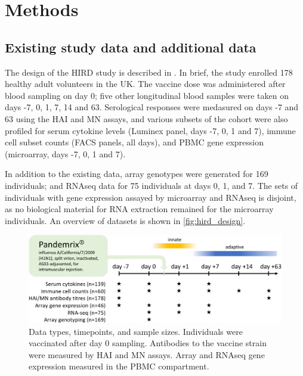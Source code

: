\section{Methods}

\subsection{Existing  study data and additional data}

The design of the \gls{HIRD} study is described in \autocite{sobolev2016AdjuvantedInfluenzaH1N1Vaccination}.
In brief, the study enrolled 178 healthy adult volunteers in the UK.
The vaccine dose was administered after blood sampling on day 0; five other longitudinal blood samples were taken on days -7, 0, 1, 7, 14 and 63.
Serological responses were medasured on days -7 and 63 using the \gls{HAI} and \gls{MN} assays, and various subsets of the cohort were also profiled for serum cytokine levels (Luminex panel, days -7, 0, 1 and 7), immune cell subset counts (\gls{FACS} panels, all days), and \gls{PBMC} gene expression (microarray, days -7, 0, 1 and 7).

In addition to the existing data, array genotypes were generated for 169 individuals; and \gls{RNAseq} data for 75 individuals at days 0, 1, and 7.
The sets of individuals with gene expression assayed by microarray and \gls{RNAseq} is disjoint, as no biological material for RNA extraction remained for the microarray individuals.
An overview of datasets is shown in \autoref{fig:hird_design}.

\begin{figure}
    \includegraphics[width=1.0\textwidth]{mainmatter/figures/chapter_02/graphics_ashg19/hird_design-crop.pdf}
    \caption{Data types, timepoints, and sample sizes. Individuals were vaccinated after day 0 sampling. Antibodies to the vaccine strain were measured by \gls{HAI} and \gls{MN} assays. Array and \gls{RNAseq} gene expression measured in the \gls{PBMC} compartment.}
    \label{fig:hird_design}
\end{figure}

